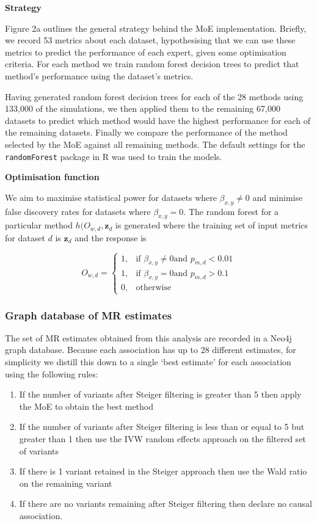 \documentclass[]{article}
\providecommand{\tightlist}{%
  \setlength{\itemsep}{0pt}\setlength{\parskip}{0pt}}
\begin{document}
\textbf{Strategy}

Figure 2a outlines the general strategy behind the MoE implementation.
Briefly, we record 53 metrics about each dataset, hypothesising that we
can use these metrics to predict the performance of each expert, given
some optimisation criteria. For each method we train random forest
decision trees to predict that method's performance using the dataset's
metrics.

Having generated random forest decision trees for each of the 28 methods
using 133,000 of the simulations, we then applied them to the remaining
67,000 datasets to predict which method would have the highest
performance for each of the remaining datasets. Finally we compare the
performance of the method selected by the MoE against all remaining
methods. The default settings for the \texttt{randomForest} package in R
was used to train the models.

\textbf{Optimisation function}

We aim to maximise statistical power for datasets where
\(\beta_{x,y} \neq 0\) and minimise false discovery rates for datasets
where \(\beta_{x,y} = 0\). The random forest for a particular method
\(h(O_{w,d}, \textbf{z}_{d}\) is generated where the training set of
input metrics for dataset \(d\) is \(\textbf{z}_{d}\) and the response
is

\[
    O_{w,d} = 
\begin{cases}
    1,   & \text{if } \beta_{x,y} \neq 0 \text{and } p_{m,d} < 0.01\\
    1,   & \text{if } \beta_{x,y} = 0 \text{and } p_{m,d} > 0.1 \\
    0,   & \text{otherwise}
\end{cases}
\]

\subsubsection{Graph database of MR
estimates}\label{graph-database-of-mr-estimates}

The set of MR estimates obtained from this analysis are recorded in a
Neo4j graph database. Because each association has up to 28 different
estimates, for simplicity we distill this down to a single `best
estimate' for each association using the following rules:

\begin{enumerate}
\def\labelenumi{\arabic{enumi}.}
\tightlist
\item
  If the number of variants after Steiger filtering is greater than 5
  then apply the MoE to obtain the best method
\item
  If the number of variants after Steiger filtering is less than or
  equal to 5 but greater than 1 then use the IVW random effects approach
  on the filtered set of variants
\item
  If there is 1 variant retained in the Steiger approach then use the
  Wald ratio on the remaining variant
\item
  If there are no variants remaining after Steiger filtering then
  declare no causal association.
\end{enumerate}
\end{document}
